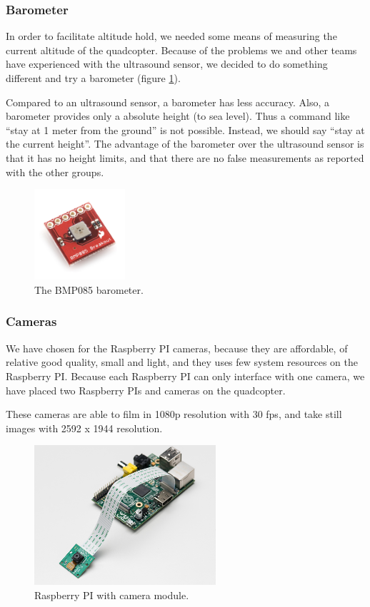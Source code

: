 \documentclass[11pt, a4paper, onecolumn, oneside, parskip=half]{scrartcl}
\begin{document}
\subsubsection{Barometer}
\label{sec:arch:sensors:batometer}
In order to facilitate altitude hold, we needed some means of measuring the current altitude of the quadcopter. Because of the problems we and other teams have experienced with the ultrasound sensor, we decided to do something different and try a barometer (figure \ref{fig:BMP085}).

Compared to an ultrasound sensor, a barometer has less accuracy. Also, a barometer provides only a absolute height (to sea level). Thus a command like ``stay at 1 meter from the ground'' is not possible. Instead, we should say ``stay at the current height''. The advantage of the barometer over the ultrasound sensor is that it has no height limits, and that there are no false measurements as reported with the other groups.

\begin{figure}[ht]
\centering
\includegraphics[width=0.3\textwidth]{BMP085}
\caption{The BMP085 barometer.}
\label{fig:BMP085}
\end{figure}

\subsubsection{Cameras}
\label{sec:arch:sensors:cameras}
We have chosen for the Raspberry PI cameras, because they are affordable, of relative good quality, small and light, and they uses few system resources on the Raspberry PI. Because each Raspberry PI can only interface with one camera, we have placed two Raspberry PIs and cameras on the quadcopter.

These cameras are able to film in 1080p resolution with 30 fps, and take still images with 2592 x 1944 resolution.


\begin{figure}[ht]
\centering
\includegraphics[width=0.6\textwidth]{image03}
\caption{Raspberry PI with camera module.}
\label{fig:raspicamera}
\end{figure}
\end{document}

